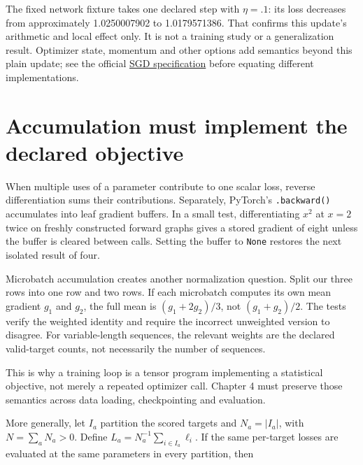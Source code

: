 The fixed network fixture takes one declared step with \(\eta=.1\): its
loss decreases from approximately 1.0250007902 to 1.0179571386. That
confirms this update's arithmetic and local effect only. It is not a
training study or a generalization result. Optimizer state, momentum and
other options add semantics beyond this plain update; see the official
\href{https://docs.pytorch.org/docs/2.10/generated/torch.optim.SGD.html}{SGD
specification} before equating different implementations.

\section{Accumulation must implement the declared
objective}\label{accumulation-must-implement-the-declared-objective}

When multiple uses of a parameter contribute to one scalar loss, reverse
differentiation sums their contributions. Separately, PyTorch's
\texttt{.backward()} accumulates into leaf gradient buffers. In a small
test, differentiating \(x^2\) at \(x=2\) twice on freshly constructed
forward graphs gives a stored gradient of eight unless the buffer is
cleared between calls. Setting the buffer to \texttt{None} restores the
next isolated result of four.

Microbatch accumulation creates another normalization question. Split
our three rows into one row and two rows. If each microbatch computes
its own mean gradient \(g_1\) and \(g_2\), the full mean is
\((g_1+2g_2)/3\), not \((g_1+g_2)/2\). The tests verify the weighted
identity and require the incorrect unweighted version to disagree. For
variable-length sequences, the relevant weights are the declared
valid-target counts, not necessarily the number of sequences.

This is why a training loop is a tensor program implementing a
statistical objective, not merely a repeated optimizer call. Chapter 4
must preserve those semantics across data loading, checkpointing and
evaluation.


More generally, let \(I_a\) partition the scored targets and
\(N_a=|I_a|\), with \(N=\sum_a N_a>0\). Define
\(L_a=N_a^{-1}\sum_{i\in I_a}\ell_i\). If the same per-target losses are
evaluated at the same parameters in every partition, then

